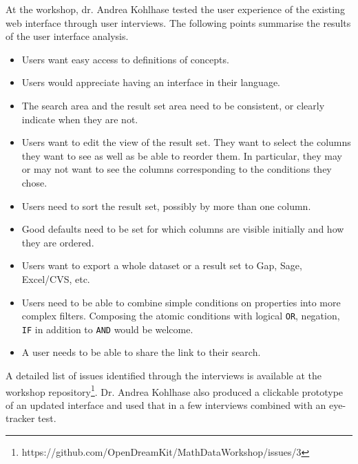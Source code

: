 At the workshop, dr. Andrea Kohlhase tested the user experience 
of the existing web interface through user interviews.
The following points summarise the results of the user interface analysis.
\begin{itemize}
\item Users want easy access to definitions of concepts.
\item Users would appreciate having an interface in their language.
\item The search area and the result set area need to be consistent, or clearly indicate when they are not.
\item Users want to edit the view of the result set.
They want to select the columns they want to see as well as be able to reorder them.
In particular, they may or may not want to see the columns corresponding to the conditions they chose.
\item Users need to sort the result set, possibly by more than one column.
\item Good defaults need to be set for which columns are visible initially and how they are ordered.
\item Users want to export a whole dataset or a result set to Gap, Sage, Excel/CVS, etc.
\item Users need to be able to combine simple conditions on properties into more complex filters.
Composing the atomic conditions with logical \texttt{OR}, negation, \texttt{IF} in addition to \texttt{AND} would be welcome.
\item A user needs to be able to share the link to their search.
\end{itemize}
A detailed list of issues identified through the interviews is available at the 
workshop repository\footnote{https://github.com/OpenDreamKit/MathDataWorkshop/issues/3}.
Dr. Andrea Kohlhase also produced a clickable prototype of an updated interface
and used that in a few interviews combined with an eye-tracker test.

